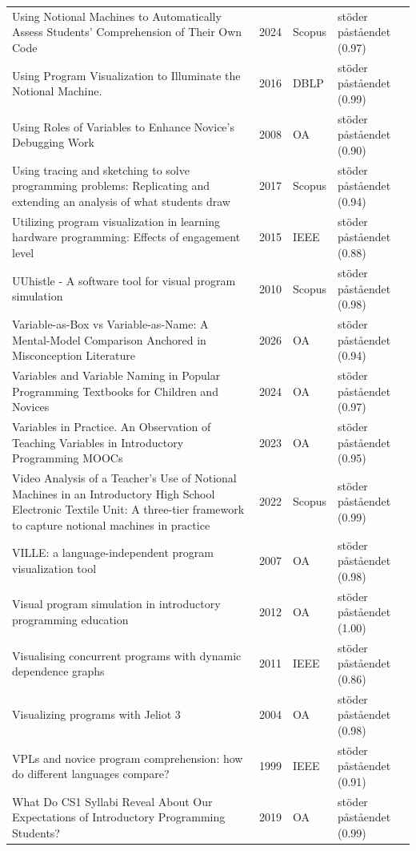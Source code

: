 \begin{longtable}{@{}%
  >{\raggedright\arraybackslash}p{}c%
  >{\raggedright\arraybackslash}p{}%
  >{\raggedright\arraybackslash}p{}@{}}
Using Notional Machines to Automatically Assess Students' Comprehension of Their Own Code & 2024 & Scopus & stöder påståendet (0.97) \\
Using Program Visualization to Illuminate the Notional Machine. & 2016 & DBLP & stöder påståendet (0.99) \\
Using Roles of Variables to Enhance Novice's Debugging Work & 2008 & OA & stöder påståendet (0.90) \\
Using tracing and sketching to solve programming problems: Replicating and extending an analysis of what students draw & 2017 & Scopus & stöder påståendet (0.94) \\
Utilizing program visualization in learning hardware programming: Effects of engagement level & 2015 & IEEE & stöder påståendet (0.88) \\
UUhistle - A software tool for visual program simulation & 2010 & Scopus & stöder påståendet (0.98) \\
Variable-as-Box vs Variable-as-Name: A Mental-Model Comparison Anchored in Misconception Literature & 2026 & OA & stöder påståendet (0.94) \\
Variables and Variable Naming in Popular Programming Textbooks for Children and Novices & 2024 & OA & stöder påståendet (0.97) \\
Variables in Practice. An Observation of Teaching Variables in Introductory Programming MOOCs & 2023 & OA & stöder påståendet (0.95) \\
Video Analysis of a Teacher's Use of Notional Machines in an Introductory High School Electronic Textile Unit: A three-tier framework to capture notional machines in practice & 2022 & Scopus & stöder påståendet (0.99) \\
VILLE: a language-independent program visualization tool & 2007 & OA & stöder påståendet (0.98) \\
Visual program simulation in introductory programming education & 2012 & OA & stöder påståendet (1.00) \\
Visualising concurrent programs with dynamic dependence graphs & 2011 & IEEE & stöder påståendet (0.86) \\
Visualizing programs with Jeliot 3 & 2004 & OA & stöder påståendet (0.98) \\
VPLs and novice program comprehension: how do different languages compare? & 1999 & IEEE & stöder påståendet (0.91) \\
What Do CS1 Syllabi Reveal About Our Expectations of Introductory Programming Students? & 2019 & OA & stöder påståendet (0.99) \\

\end{longtable}
